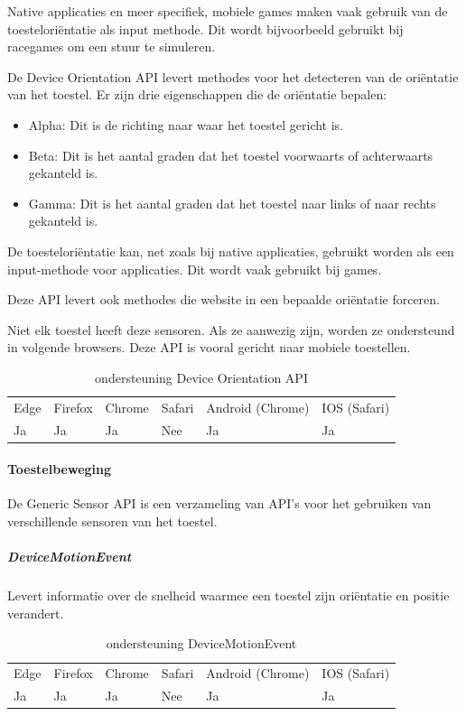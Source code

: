 Native applicaties en meer specifiek, mobiele games maken vaak gebruik van de toesteloriëntatie als input methode. Dit wordt bijvoorbeeld gebruikt bij racegames om een stuur te simuleren.

De Device Orientation API \autocite{Tibbett2020a} levert methodes voor het detecteren van de oriëntatie van het toestel. Er zijn drie eigenschappen die de oriëntatie bepalen:


 \begin{itemize}
	\item	Alpha:  Dit is de richting naar waar het toestel gericht is.
	\item	Beta:  Dit is het aantal graden dat het toestel voorwaarts of achterwaarts gekanteld is.
	\item   Gamma: Dit is het aantal graden dat het toestel naar links of naar rechts gekanteld is.
\end{itemize}


De toesteloriëntatie kan, net zoals bij native applicaties, gebruikt worden als een input-methode voor applicaties. Dit wordt vaak gebruikt bij games.

Deze API levert ook methodes die website in een bepaalde oriëntatie forceren.

Niet elk toestel heeft deze sensoren. Als ze aanwezig zijn, worden ze ondersteund in volgende browsers. Deze API is vooral gericht naar mobiele toestellen. 

\begin{table}[H]
	\centering
	\begin{tabular}{llllll}
		Edge & Firefox & Chrome & Safari & Android (Chrome) & IOS (Safari) \\
		Ja   & Ja      &  Ja   & Nee     & Ja               & Ja          
	\end{tabular}	
	\caption{ondersteuning Device Orientation API }
\end{table}

\paragraph{Toestelbeweging}
De Generic Sensor API \autocite{Waldroon2020} is een verzameling van API’s voor het gebruiken van verschillende sensoren van het toestel.

	\subparagraph{DeviceMotionEvent }
	Levert informatie over de snelheid waarmee een toestel zijn oriëntatie en positie verandert.
	
	\begin{table}[H]
		\centering
		\begin{tabular}{llllll}
			Edge & Firefox & Chrome & Safari & Android (Chrome) & IOS (Safari) \\
			Ja   & Ja      &  Ja   & Nee     & Ja               & Ja          
		\end{tabular}	
		\caption{ondersteuning	DeviceMotionEvent  }
	\end{table} 
	
